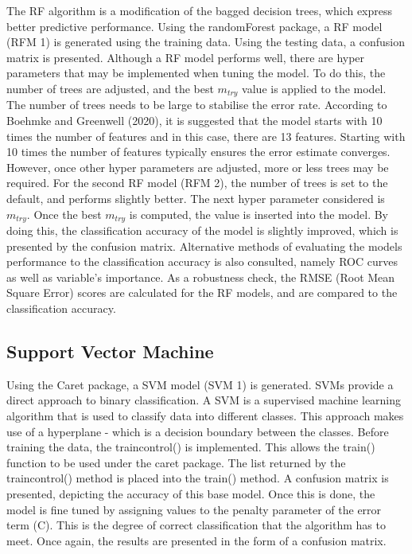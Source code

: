 \documentclass[11pt,preprint, authoryear]{elsarticle}
\numberwithin{equation}{section}
\numberwithin{figure}{section}
\numberwithin{table}{section}
\begin{document}
The RF algorithm is a modification of the bagged decision trees, which
express better predictive performance. Using the randomForest package, a
RF model (RFM 1) is generated using the training data. Using the testing
data, a confusion matrix is presented. Although a RF model performs
well, there are hyper parameters that may be implemented when tuning the
model. To do this, the number of trees are adjusted, and the best
\(m_{try}\) value is applied to the model. The number of trees needs to
be large to stabilise the error rate. According to Boehmke and Greenwell
(2020), it is suggested that the model starts with 10 times the number
of features and in this case, there are 13 features. Starting with 10
times the number of features typically ensures the error estimate
converges. However, once other hyper parameters are adjusted, more or
less trees may be required. For the second RF model (RFM 2), the number
of trees is set to the default, and performs slightly better. The next
hyper parameter considered is \(m_{try}\). Once the best \(m_{try}\) is
computed, the value is inserted into the model. By doing this, the
classification accuracy of the model is slightly improved, which is
presented by the confusion matrix. Alternative methods of evaluating the
models performance to the classification accuracy is also consulted,
namely ROC curves as well as variable's importance. As a robustness
check, the RMSE (Root Mean Square Error) scores are calculated for the
RF models, and are compared to the classification accuracy.

\hypertarget{support-vector-machine}{%
\subsection{Support Vector Machine}\label{support-vector-machine}}

Using the Caret package, a SVM model (SVM 1) is generated. SVMs provide
a direct approach to binary classification. A SVM is a supervised
machine learning algorithm that is used to classify data into different
classes. This approach makes use of a hyperplane - which is a decision
boundary between the classes. Before training the data, the
traincontrol() is implemented. This allows the train() function to be
used under the caret package. The list returned by the traincontrol()
method is placed into the train() method. A confusion matrix is
presented, depicting the accuracy of this base model. Once this is done,
the model is fine tuned by assigning values to the penalty parameter of
the error term (C). This is the degree of correct classification that
the algorithm has to meet. Once again, the results are presented in the
form of a confusion matrix.
\end{document}
